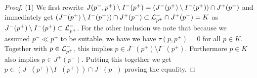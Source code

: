 \begin{proof}
(1) We first rewrite $J(p^-,p^+)\setminus I^-(p^+)=(J^-(p^+)\setminus I^-(p^+))\cap J^+(p^-)$ and immediately get $(J^-(p^+)\setminus I^-(p^+))\cap J^+(p^-)\subset {\mathcal{L}}^-_{p^+}\cap J^+(p^-)=K$ as $J^-(p^+)\setminus I^-(p^+)\subset {\mathcal{L}}^-_{p^+}$. For the other inclusion we note that because we assumed $p^-\ll p^+$ to be suitable, we have we have $\tau(p,p^+)=0$ for all $p\in K$. Together with $p\in {\mathcal{L}}_{p^+}^- $, this implies $p\in J^-(p^+)\setminus I^-(p^+)$. Furthermore $p\in K$ also implies $p\in J^+(p^-)$. Putting this together we get $p\in (J^-(p^+)\setminus I^-(p^+))\cap J^+(p^-)$ proving the equality.






\end{proof}

